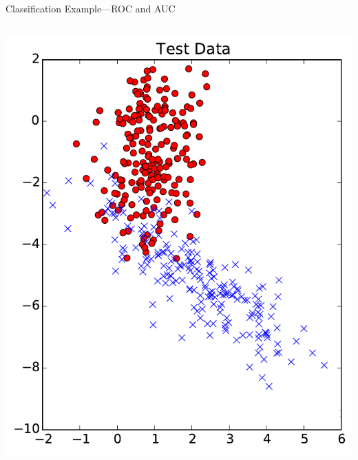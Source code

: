 \documentclass[10pt, aspectratio=169]{beamer} %
\begin{document}
\begin{frame}{Classification Example---ROC and AUC}
\begin{columns}
\centerline{\includegraphics[width=0.8\columnwidth]{TestData_2class.pdf}}
\end{columns}
\end{frame}
\end{document}
